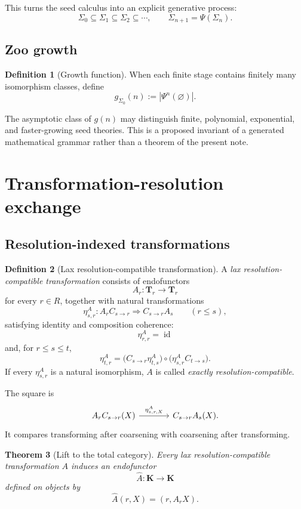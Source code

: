 \documentclass[11pt]{article}
\newtheorem{theorem}{Theorem}[section]
\theoremstyle{definition}
\newtheorem{definition}[theorem]{Definition}
\theoremstyle{remark}
\newcommand{\K}{\mathbf K}
\newcommand{\Tcat}{\mathbf T}
\newcommand{\Seeds}{\Sigma}
\newcommand{\id}{\operatorname{id}}
\begin{document}
This turns the seed calculus into an explicit generative process:
\[
\Seeds_0
\subseteq
\Seeds_1
\subseteq
\Seeds_2
\subseteq\cdots,
\qquad
\Seeds_{n+1}=\Psi(\Seeds_n).
\]

\subsection{Zoo growth}

\begin{definition}[Growth function]
When each finite stage contains finitely many isomorphism classes, define
\[
g_{\Seeds_0}(n):=|\Psi^n(\varnothing)|.
\]
\end{definition}

The asymptotic class of $g(n)$ may distinguish finite, polynomial, exponential, and faster-growing seed theories. This is a proposed invariant of a generated mathematical grammar rather than a theorem of the present note.

\section{Transformation-resolution exchange}

\subsection{Resolution-indexed transformations}

\begin{definition}[Lax resolution-compatible transformation]\label{def:laxtrans}
A \emph{lax resolution-compatible transformation} consists of endofunctors
\[
A_r:\Tcat_r\to\Tcat_r
\]
for every $r\in R$, together with natural transformations
\[
\eta^A_{s,r}:
A_rC_{s\to r}
\Longrightarrow
C_{s\to r}A_s
\qquad(r\le s),
\]
satisfying identity and composition coherence:
\[
\eta^A_{r,r}=\id
\]
and, for $r\le s\le t$,
\[
\eta^A_{t,r}
=
\bigl(C_{s\to r}\eta^A_{t,s}\bigr)
\circ
\bigl(\eta^A_{s,r}C_{t\to s}\bigr).
\]
If every $\eta^A_{s,r}$ is a natural isomorphism, $A$ is called \emph{exactly resolution-compatible}.
\end{definition}

The square is
\[
\begin{tikzcd}[column sep=large,row sep=large]
A_rC_{s\to r}(X) \arrow[r,"\eta^A_{s,r,X}"] & C_{s\to r}A_s(X).
\end{tikzcd}
\]
It compares transforming after coarsening with coarsening after transforming.

\begin{theorem}[Lift to the total category]\label{thm:lift-total}
Every lax resolution-compatible transformation $A$ induces an endofunctor
\[
\widehat A:\K\to\K
\]
defined on objects by
\[
\widehat A(r,X)=(r,A_rX).
\]
\end{theorem}
\end{document}
